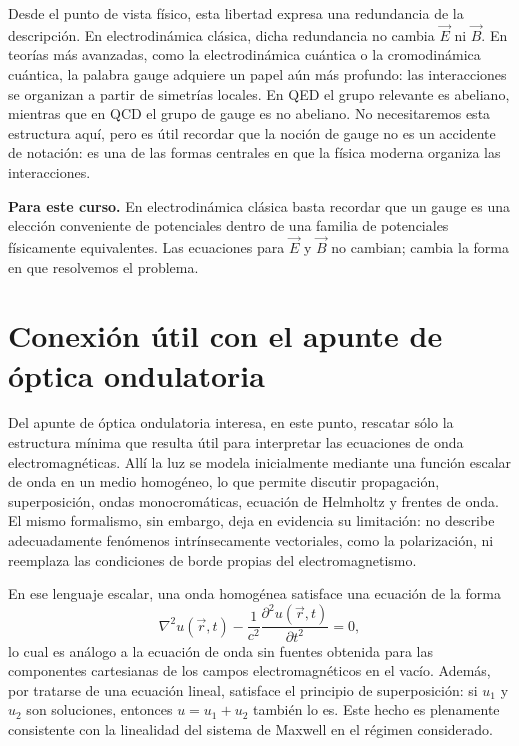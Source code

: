 \documentclass[12pt,a4paper]{article}
\theoremstyle{definition}
\theoremstyle{plain}
\numberwithin{equation}{section}
\theoremstyle{remark}
\newcommand{\E}{\vec{E}}
\newcommand{\B}{\vec{B}}
\begin{document}
Desde el punto de vista físico, esta libertad expresa una redundancia de la descripción. En electrodinámica clásica, dicha redundancia no cambia $\E$ ni $\B$. En teorías más avanzadas, como la electrodinámica cuántica o la cromodinámica cuántica, la palabra gauge adquiere un papel aún más profundo: las interacciones se organizan a partir de simetrías locales. En QED el grupo relevante es abeliano, mientras que en QCD el grupo de gauge es no abeliano. No necesitaremos esta estructura aquí, pero es útil recordar que la noción de gauge no es un accidente de notación: es una de las formas centrales en que la física moderna organiza las interacciones.

\begin{cajaidea}
\textbf{Para este curso.} En electrodinámica clásica basta recordar que un gauge es una elección conveniente de potenciales dentro de una familia de potenciales físicamente equivalentes. Las ecuaciones para $\E$ y $\B$ no cambian; cambia la forma en que resolvemos el problema.
\end{cajaidea}

\section{Conexión útil con el apunte de óptica ondulatoria}
\label{ap:optica-ondulatoria}

Del apunte de óptica ondulatoria interesa, en este punto, rescatar sólo la estructura mínima que resulta útil para interpretar las ecuaciones de onda electromagnéticas. Allí la luz se modela inicialmente mediante una función escalar de onda en un medio homogéneo, lo que permite discutir propagación, superposición, ondas monocromáticas, ecuación de Helmholtz y frentes de onda. El mismo formalismo, sin embargo, deja en evidencia su limitación: no describe adecuadamente fenómenos intrínsecamente vectoriales, como la polarización, ni reemplaza las condiciones de borde propias del electromagnetismo.

En ese lenguaje escalar, una onda homogénea satisface una ecuación de la forma
\begin{equation*}
    \nabla^2 u(\vec r,t)-\frac{1}{c^2}\frac{\partial^2 u(\vec r,t)}{\partial t^2}=0,
\end{equation*}
lo cual es análogo a la ecuación de onda sin fuentes obtenida para las componentes cartesianas de los campos electromagnéticos en el vacío. Además, por tratarse de una ecuación lineal, satisface el principio de superposición: si $u_1$ y $u_2$ son soluciones, entonces $u=u_1+u_2$ también lo es. Este hecho es plenamente consistente con la linealidad del sistema de Maxwell en el régimen considerado.
\end{document}
